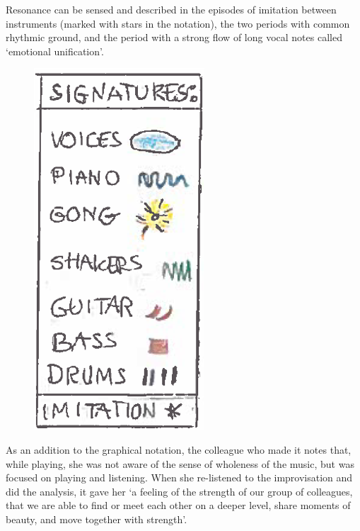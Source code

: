 \FloatBarrier
    \begin{adjmulticols}{2}{0mm}{0mm}
\par
Resonance can be sensed and described in the episodes of imitation between instruments (marked with stars in the notation), the two periods with common rhythmic ground, and the period with a strong flow of long vocal notes called ‘emotional unification’.
\noindent
\begin{figure}[H]
\centering %
\caption{} %
\includegraphics[width=0.5\linewidth]{paper2/p2_data/p2-fig4.png}
\label{fig:p2:4}
\end{figure}
\par
As an addition to the graphical notation, the colleague who made it notes that, while playing, she was not aware of the sense of wholeness of the music, but was focused on playing and listening. When she re-listened to the improvisation and did the analysis, it gave her ‘a feeling of the strength of our group of colleagues, that we are able to find or meet each other on a deeper level, share moments of beauty, and move together with strength’. 


\end{adjmulticols}

